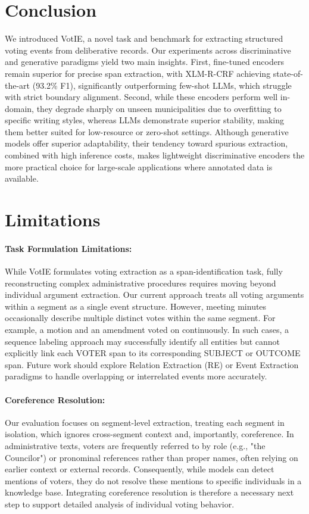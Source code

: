 \documentclass[11pt]{article}
\begin{document}
\section{Conclusion}
\label{sec:conclusion}
We introduced VotIE, a novel task and benchmark for extracting structured voting events from deliberative records. Our experiments across discriminative and generative paradigms yield two main insights. First, fine-tuned encoders remain superior for precise span extraction, with XLM-R-CRF achieving state-of-the-art (93.2\% F1), significantly outperforming few-shot LLMs, which struggle with strict boundary alignment. Second, while these encoders perform well in-domain, they degrade sharply on unseen municipalities due to overfitting to specific writing styles, whereas LLMs demonstrate superior stability, making them better suited for low-resource or zero-shot settings. Although generative models offer superior adaptability, their tendency toward spurious extraction, combined with high inference costs, makes lightweight discriminative encoders the more practical choice for large-scale applications where annotated data is available.


\section{Limitations}
\label{sec:limitations}

 \paragraph{Task Formulation Limitations:} While VotIE formulates voting extraction as a span-identification task, fully reconstructing complex administrative procedures requires moving beyond individual argument extraction. Our current approach treats all voting arguments within a segment as a single event structure. However, meeting minutes occasionally describe multiple distinct votes within the same segment. For example, a motion and an amendment voted on continuously. In such cases, a sequence labeling approach may successfully identify all entities but cannot explicitly link each VOTER span to its corresponding SUBJECT or OUTCOME span. Future work should explore Relation Extraction (RE) or Event Extraction paradigms to handle overlapping or interrelated events more accurately.
 
\paragraph{Coreference Resolution:} Our evaluation focuses on segment-level extraction, treating each segment in isolation, which ignores cross-segment context and, importantly, coreference. In administrative texts, voters are frequently referred to by role (e.g., "the Councilor") or pronominal references rather than proper names, often relying on earlier context or external records. Consequently, while models can detect mentions of voters, they do not resolve these mentions to specific individuals in a knowledge base. Integrating coreference resolution is therefore a necessary next step to support detailed analysis of individual voting behavior.
\end{document}
